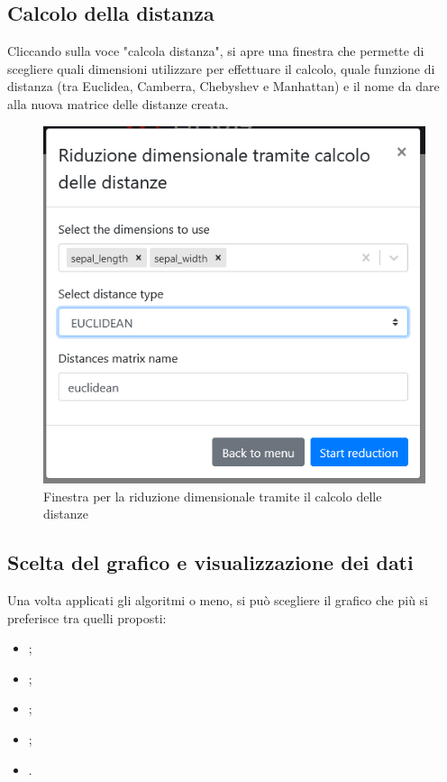 \subsection{Calcolo della distanza}
Cliccando sulla voce "calcola distanza", si apre una finestra che permette di scegliere quali dimensioni utilizzare per effettuare il calcolo, quale funzione di distanza (tra Euclidea, Camberra, Chebyshev e Manhattan) e il nome da dare alla nuova matrice delle distanze creata.
\begin{figure}[H]
		\includegraphics[scale=0.5]{Images/CalcoloDistanze.png}
		\centering
		\caption{Finestra per la riduzione dimensionale tramite il calcolo delle distanze}
\end{figure}

\subsection{Scelta del grafico e visualizzazione dei dati}
Una volta applicati gli algoritmi o meno, si può scegliere il grafico che più si preferisce tra quelli proposti:
\begin{itemize}
	\item {};
	\item {};
	\item {};
	\item {};
	\item {}.
\end{itemize}

